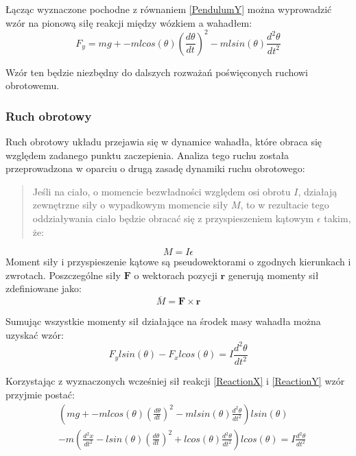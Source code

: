 \documentclass[12pt, oneside]{report}
\theoremstyle{definition}
\begin{document}
Łącząc wyznaczone pochodne z równaniem \ref{PendulumY} można wyprowadzić wzór na pionową siłę reakcji między wózkiem a wahadłem:
\begin{equation} \label{ReactionY}
F_y = mg + -mlcos(\theta) (\frac{d\theta}{dt})^2 - mlsin(\theta) \frac{d^2\theta}{dt^2}
\end{equation}

Wzór ten będzie niezbędny do dalszych rozważań poświęconych ruchowi obrotowemu.

\subsubsection{Ruch obrotowy}
Ruch obrotowy układu przejawia się w dynamice wahadła, które obraca się względem zadanego punktu zaczepienia.
Analiza tego ruchu została przeprowadzona w oparciu o drugą zasadę dynamiki ruchu obrotowego:
\begin{quote}
Jeśli na ciało, o momencie bezwładności względem osi obrotu $I$, działają zewnętrzne siły o wypadkowym momencie siły $M$, to w rezultacie tego oddziaływania ciało będzie obracać się z przyspieszeniem kątowym $\epsilon$ takim, że:
\end{quote}
\begin{equation}
M = I \epsilon
\end{equation}
Moment siły i przyspieszenie kątowe są pseudowektorami o zgodnych kierunkach i zwrotach. Poszczególne siły $\mathbf{F}$ o wektorach pozycji $\mathbf{r}$ generują momenty sił  zdefiniowane jako:
\begin{equation}
\overline{M} = \mathbf{F} \times \mathbf{r}
\end{equation}

Sumując wszystkie momenty sił działające na środek masy wahadła można uzyskać wzór:
\begin{equation}
F_y l sin(\theta) - F_x lcos(\theta) = I\frac{d^2\theta}{dt^2}
\end{equation}

Korzystając z wyznaczonych wcześniej sił reakcji \ref{ReactionX} i \ref{ReactionY} wzór przyjmie postać:
\begin{equation}
\begin{aligned}
&(mg + -mlcos(\theta) (\frac{d\theta}{dt})^2 - mlsin(\theta) \frac{d^2\theta}{dt^2})lsin(\theta)\\
&-m (\frac{d^2x}{dt^2} - lsin(\theta)(\frac{d\theta}{dt})^2 + lcos(\theta) \frac{d^2\theta}{dt^2})lcos(\theta) = I\frac{d^2\theta}{dt^2}
\end{aligned}
\end{equation}
\end{document}
